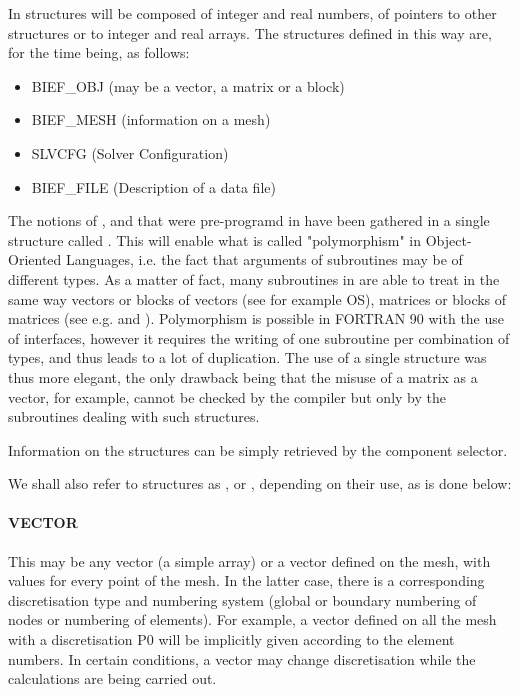 In \bief structures will be composed of integer and real numbers, of pointers to
other structures or to integer and real arrays. The structures defined in this
way are, for the time being, as follows:
\begin{itemize}
\item BIEF\_OBJ (may be a vector, a matrix or a block)
\item BIEF\_MESH (information on a mesh)
\item SLVCFG (Solver Configuration)
\item BIEF\_FILE (Description of a data file)
\end{itemize}
The notions of ,  and  that were
pre-programd in  have been gathered in a single structure called
. This will enable what is called "polymorphism" in Object-Oriented Languages, i.e. the fact that arguments of subroutines may be of
different types. As a matter of fact, many subroutines in \bief are able to
treat in the same way vectors or blocks of vectors (see for example OS),
matrices or blocks of matrices (see e.g.  and ).
Polymorphism is possible in FORTRAN 90 with the use of interfaces, however it
requires the writing of one subroutine per combination of types, and thus leads
to a lot of duplication. The use of a single structure  was
thus more elegant, the only drawback being that the misuse of a matrix as a
vector, for example, cannot be checked by the compiler but only by the
subroutines dealing with such structures.


Information on the structures can be simply retrieved by the component
selector.


We shall also refer to  structures as ,
 or , depending on their use, as is done below:

\paragraph{VECTOR}

This may be any vector (a simple array) or a vector defined on the mesh, with
values for every point of the mesh. In the latter case, there is a
corresponding discretisation type and numbering system (global or boundary
numbering of nodes or numbering of elements). For example, a vector defined on
all the mesh with a discretisation P0 will be implicitly given according to the
element numbers. In certain conditions, a vector may change discretisation
while the calculations are being carried out.

